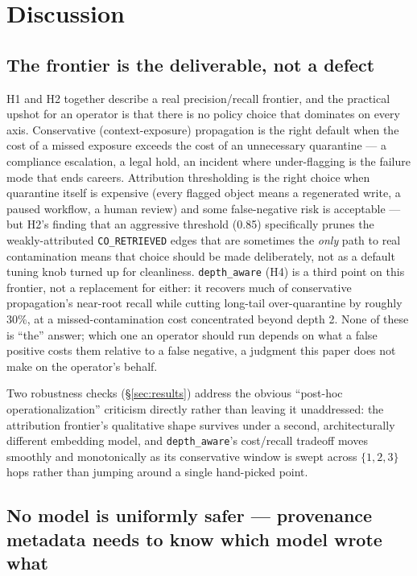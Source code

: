 \section{Discussion}

\subsection{The frontier is the deliverable, not a defect}

H1 and H2 together describe a real precision/recall frontier, and the
practical upshot for an operator is that there is no policy choice that
dominates on every axis. Conservative (context-exposure) propagation is
the right default when the cost of a missed exposure exceeds the cost
of an unnecessary quarantine --- a compliance escalation, a legal hold,
an incident where under-flagging is the failure mode that ends
careers. Attribution thresholding is the right choice when quarantine
itself is expensive (every flagged object means a regenerated write, a
paused workflow, a human review) and some false-negative risk is
acceptable --- but H2's finding that an aggressive threshold (0.85)
specifically prunes the weakly-attributed \texttt{CO\_RETRIEVED} edges
that are sometimes the \emph{only} path to real contamination means
that choice should be made deliberately, not as a default tuning knob
turned up for cleanliness. \texttt{depth\_aware} (H4) is a third point
on this frontier, not a replacement for either: it recovers much of
conservative propagation's near-root recall while cutting long-tail
over-quarantine by roughly 30\%, at a missed-contamination cost
concentrated beyond depth 2. None of these is ``the'' answer; which one
an operator should run depends on what a false positive costs them
relative to a false negative, a judgment this paper does not make on
the operator's behalf.

Two robustness checks (\S\ref{sec:results}) address the obvious
``post-hoc operationalization'' criticism directly rather than leaving
it unaddressed: the attribution frontier's qualitative shape survives
under a second, architecturally different embedding model, and
\texttt{depth\_aware}'s cost/recall tradeoff moves smoothly and
monotonically as its conservative window is swept across $\{1, 2, 3\}$
hops rather than jumping around a single hand-picked point.

\subsection{No model is uniformly safer --- provenance metadata needs to know which model wrote what}

